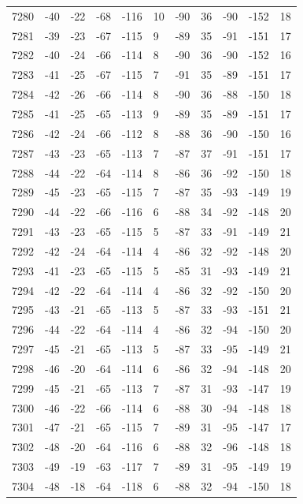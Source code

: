 \begin{table}[H]
\begin{tabular}{lllllllllll}
7280 & -40 & -22 & -68 & -116 & 10 & -90 & 36 & -90 & -152 & 18 \\
7281 & -39 & -23 & -67 & -115 & 9 & -89 & 35 & -91 & -151 & 17 \\
7282 & -40 & -24 & -66 & -114 & 8 & -90 & 36 & -90 & -152 & 16 \\
7283 & -41 & -25 & -67 & -115 & 7 & -91 & 35 & -89 & -151 & 17 \\
7284 & -42 & -26 & -66 & -114 & 8 & -90 & 36 & -88 & -150 & 18 \\
7285 & -41 & -25 & -65 & -113 & 9 & -89 & 35 & -89 & -151 & 17 \\
7286 & -42 & -24 & -66 & -112 & 8 & -88 & 36 & -90 & -150 & 16 \\
7287 & -43 & -23 & -65 & -113 & 7 & -87 & 37 & -91 & -151 & 17 \\
7288 & -44 & -22 & -64 & -114 & 8 & -86 & 36 & -92 & -150 & 18 \\
7289 & -45 & -23 & -65 & -115 & 7 & -87 & 35 & -93 & -149 & 19 \\
7290 & -44 & -22 & -66 & -116 & 6 & -88 & 34 & -92 & -148 & 20 \\
7291 & -43 & -23 & -65 & -115 & 5 & -87 & 33 & -91 & -149 & 21 \\
7292 & -42 & -24 & -64 & -114 & 4 & -86 & 32 & -92 & -148 & 20 \\
7293 & -41 & -23 & -65 & -115 & 5 & -85 & 31 & -93 & -149 & 21 \\
7294 & -42 & -22 & -64 & -114 & 4 & -86 & 32 & -92 & -150 & 20 \\
7295 & -43 & -21 & -65 & -113 & 5 & -87 & 33 & -93 & -151 & 21 \\
7296 & -44 & -22 & -64 & -114 & 4 & -86 & 32 & -94 & -150 & 20 \\
7297 & -45 & -21 & -65 & -113 & 5 & -87 & 33 & -95 & -149 & 21 \\
7298 & -46 & -20 & -64 & -114 & 6 & -86 & 32 & -94 & -148 & 20 \\
7299 & -45 & -21 & -65 & -113 & 7 & -87 & 31 & -93 & -147 & 19 \\
7300 & -46 & -22 & -66 & -114 & 6 & -88 & 30 & -94 & -148 & 18 \\
7301 & -47 & -21 & -65 & -115 & 7 & -89 & 31 & -95 & -147 & 17 \\
7302 & -48 & -20 & -64 & -116 & 6 & -88 & 32 & -96 & -148 & 18 \\
7303 & -49 & -19 & -63 & -117 & 7 & -89 & 31 & -95 & -149 & 19 \\
7304 & -48 & -18 & -64 & -118 & 6 & -88 & 32 & -94 & -150 & 18 \\

\end{tabular}
\end{table}
